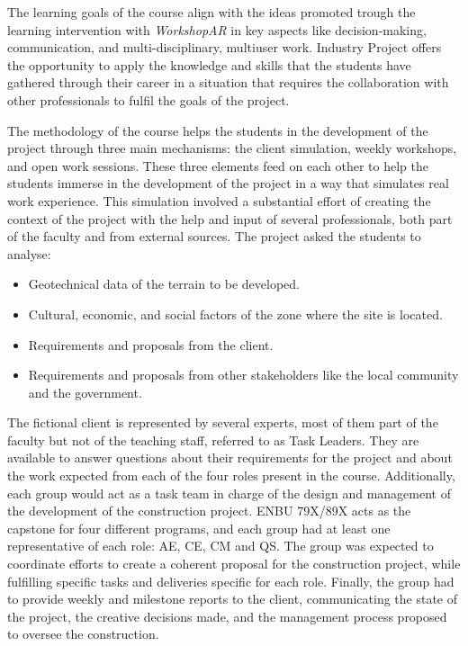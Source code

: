 The learning goals of the course align with the ideas promoted trough the learning intervention with \emph{WorkshopAR} in key aspects like decision-making, communication,
and multi-disciplinary, multiuser work. Industry Project offers the opportunity to apply the knowledge and skills that the students have gathered through their career in a
situation that requires the collaboration with other professionals to fulfil the goals of the project.

The methodology of the course helps the students in the development of the project through three main mechanisms: the client simulation, weekly workshops, and open work
sessions. These three elements feed on each other to help the students immerse in the development of the project in a way that simulates real work experience. This
simulation involved a substantial effort of creating the context of the project with the help and input of several professionals, both part of the faculty and from
external sources. The project asked the students to analyse:

\begin{itemize}
    \item Geotechnical data of the terrain to be developed.
    \item Cultural, economic, and social factors of the zone where the site is located.
    \item Requirements and proposals from the client.
    \item Requirements and proposals from other stakeholders like the local community and the government.
\end{itemize}

The fictional client is represented by several experts, most of them part of the faculty but not of the teaching staff, referred to as Task Leaders. They are available to
answer questions about their requirements for the project and about the work expected from each of the four roles present in the course. Additionally, each group would act
as a task team in charge of the design and management of the development of the construction project. ENBU 79X/89X acts as the capstone for four different programs, and
each group had at least one representative of each role: \acf{AE}, \acf{CE}, \acf{CM} and \acf{QS}. The group was expected to coordinate efforts to create a coherent proposal
for the construction project, while fulfilling specific tasks and deliveries specific for each role. Finally, the group had to provide weekly and milestone reports to the
client, communicating the state of the project, the creative decisions made, and the management process proposed to oversee the construction.

